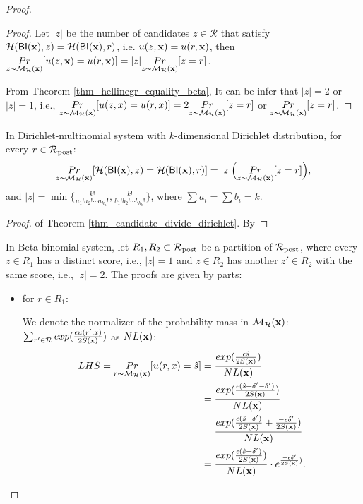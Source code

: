 \documentclass{article}
\begin{document}
\begin{proof}
\begin{proof}
 Let $|z|$ be the number of candidates $z \in \mathcal{R}$ that satisfy $\mathcal{H}(\mathsf{BI}(\textbf{x}),z) = \mathcal{H}(\mathsf{BI}(\textbf{x}),r)$, i.e. $u(z,\textbf{x}) = u(r,\textbf{x})$, then  $\underset{z \thicksim \mathcal{M}_{\mathcal{H}}(\textbf{x})}{Pr}[u(z,\textbf{x}) = u(r,\textbf{x})] = |z| \underset{z \thicksim \mathcal{M}_{\mathcal{H}}(\textbf{x})}{Pr}[z = r]$.

 From Theorem \ref{thm_hellinegr_equality_beta}, It can be infer that $|z| = 2$ or $|z| = 1$, i.e., $\underset{z \thicksim \mathcal{M}_{\mathcal{H}}(\textbf{x})}{Pr}[u(z,x) = u(r,x)] = 2 \underset{z \thicksim \mathcal{M}_{\mathcal{H}}(\textbf{x})}{Pr}[z = r]$ or $\underset{z \thicksim \mathcal{M}_{\mathcal{H}}(\textbf{x})}{Pr}[z = r]$.
 \end{proof}


\begin{thm}
 \label{thm_candidate_divide_dirichlet}
 In Dirichlet-multinomial system with $k$-dimensional Dirichlet distribution, for every $r \in \mathcal{R}_{\textup{post}}$:
 $$
 \underset{z \thicksim \mathcal{M}_{\mathcal{H}}(\textbf{x})}{Pr}[\mathcal{H}(\mathsf{BI}(\textbf{x}),z) = \mathcal{H}(\mathsf{BI}(\textbf{x}),r)] 
 = |z|\Big ( \underset{z \thicksim \mathcal{M}_{\mathcal{H}}(\textbf{x})}{Pr}[z = r]\Big ),
 $$ 
 and $|z| = \min\{\frac{k!}{a_1! a_2! \cdots a_{k_a}!},\frac{k!}{b_1! b_2! \cdots b_{k_b}!}\}$, where $\sum{a_i} = \sum{b_i} = k$.
 \end{thm}

 \begin{proof} of Theorem \ref{thm_candidate_divide_dirichlet}.
 By 
 \end{proof}


 In Beta-binomial system, let $R_1, R_2 \subset \mathcal{R}_{\textup{post}}$ be a partition of $\mathcal{R}_{\textup{post}}$, where every $z \in R_1$ has a distinct score, i.e., $|z| = 1$ and $z \in R_2$ has another $z' \in R_2$ with the same score, i.e., $|z| = 2$. The proofs are given by parts: 

 \begin{itemize}
 	\item for $r \in R_1$:

		We denote the normalizer of the probability mass in $\mathcal{M}_{\mathcal{H}}(\textbf{x})$: $\sum_{r' \in \mathcal{R}}exp(\frac{\epsilon u(r',x)}{2 S(\textbf{x})})$ as $NL(\textbf{x})$:
		\begin{equation*}
		\begin{split}
		LHS 
		  = \underset{r \thicksim \mathcal{M}_{\mathcal{H}}(\textbf{x})}{Pr}[u(r,x) = \hat{s}]
		& = \frac{exp(\frac{\epsilon \hat{s}}{2 S(\textbf{x})})}{NL(\textbf{x})}\\
		& = \frac{exp(\frac{\epsilon (\hat{s} + \delta' - \delta')}{2 S(\textbf{x})})}{NL(\textbf{x})}\\
		& = \frac{exp(\frac{\epsilon (\hat{s} + \delta')}{2 S(\textbf{x})} + \frac{- \epsilon \delta'}{2 S(\textbf{x})})}{NL(\textbf{x})}\\
		& = \frac{exp(\frac{\epsilon (\hat{s} + \delta')}{2 S(\textbf{x})})}{NL(\textbf{x})} \cdot e^{\frac{- \epsilon \delta'}{2 S(\textbf{x})})}.\\
		\end{split}
		\end{equation*}


\end{itemize}
\end{proof}
\end{document}
